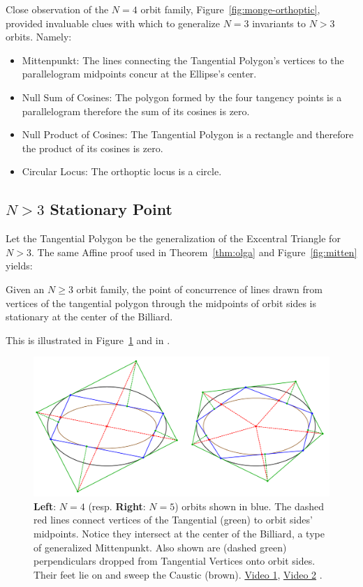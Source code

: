 Close observation of the $N=4$ orbit family, Figure~\ref{fig:monge-orthoptic}, provided invaluable clues with which to generalize $N=3$ invariants to $N>3$ orbits. Namely:

\begin{itemize}
    \item Mittenpunkt: The lines connecting the Tangential Polygon's vertices to the parallelogram midpoints concur at the Ellipse's center.
     \item Null Sum of Cosines: The polygon formed by the four 
     tangency points is a parallelogram therefore the sum of its cosines is zero.
    \item Null Product of Cosines: The Tangential Polygon is a rectangle and therefore the product of its cosines is zero.
   \item Circular Locus: The orthoptic locus is a circle.
\end{itemize}

\subsection{$N>3$ Stationary Point}

Let the Tangential Polygon be the generalization of the Excentral Triangle for $N>3$. The same Affine proof used in Theorem~\ref{thm:olga} and Figure~\ref{fig:mitten} yields:

\begin{theorem}
Given an $N\geq{3}$ orbit family, the point of concurrence of lines drawn from vertices of the tangential polygon through the midpoints of orbit sides is stationary at the center of the Billiard.
\end{theorem}

\noindent This is illustrated in Figure~\ref{fig:gen-mitten} and in   \cite[pl\#13]{dsr_math_intell_playlist}.

\begin{figure}
    \centering
    \includegraphics[width=\textwidth]{pics/u0165_extouch.pdf}
    \caption{\textbf{Left}: $N=4$ (resp. \textbf{Right}: $N=5$) orbits shown in blue. The dashed red lines connect vertices of the Tangential (green) to orbit sides' midpoints. Notice they intersect at the center of the Billiard, a type of generalized Mittenpunkt. Also shown are (dashed green) perpendiculars dropped from Tangential Vertices onto orbit sides. Their feet lie on and sweep the Caustic (brown). \href{https://youtu.be/TV2p7fPlYfE}{Video 1}, \href{https://youtu.be/Bpc-MrR2IMc}{Video 2}  \cite[pl\#18,19]{dsr_math_intell_playlist}.}
    \label{fig:gen-mitten}
\end{figure}

